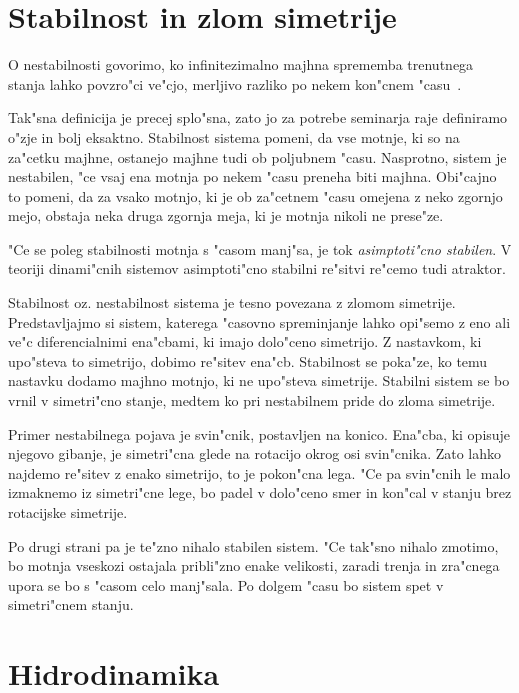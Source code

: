\documentclass[a4paper,12pt]{article}
\begin{document}
\section{Stabilnost in zlom simetrije}

O nestabilnosti govorimo, ko infinitezimalno majhna sprememba trenutnega stanja lahko povzro"ci ve"cjo, merljivo razliko po nekem kon"cnem "casu~\cite{drazin}. 

Tak"sna definicija je precej splo"sna, zato jo za potrebe seminarja raje definiramo o"zje in bolj eksaktno. Stabilnost sistema pomeni, da vse motnje, ki so na za"cetku majhne, ostanejo majhne tudi ob poljubnem "casu. Nasprotno, sistem je nestabilen, "ce vsaj ena motnja po nekem "casu preneha biti majhna. Obi"cajno to pomeni, da za vsako motnjo, ki je ob za"cetnem "casu omejena z neko zgornjo mejo, obstaja neka druga zgornja meja, ki je motnja nikoli ne prese"ze. 

"Ce se poleg stabilnosti motnja s "casom manj"sa, je tok \emph{asimptoti"cno stabilen}. V teoriji dinami"cnih sistemov asimptoti"cno stabilni re"sitvi re"cemo tudi atraktor. 

Stabilnost oz. nestabilnost sistema je tesno povezana z zlomom simetrije. Predstavljajmo si sistem, katerega "casovno spreminjanje lahko opi"semo z eno ali ve"c diferencialnimi ena"cbami, ki imajo dolo"ceno simetrijo. Z nastavkom, ki upo"steva to simetrijo, dobimo re"sitev ena"cb. Stabilnost se poka"ze, ko temu nastavku dodamo majhno motnjo, ki ne upo"steva simetrije. Stabilni sistem se bo vrnil v simetri"cno stanje, medtem ko pri nestabilnem pride do zloma simetrije. 

Primer nestabilnega pojava je svin"cnik, postavljen na konico. Ena"cba, ki opisuje njegovo gibanje, je simetri"cna glede na rotacijo okrog osi svin"cnika. Zato lahko najdemo re"sitev z enako simetrijo, to je pokon"cna lega. "Ce pa svin"cnih le malo izmaknemo iz simetri"cne lege, bo padel v dolo"ceno smer in kon"cal v stanju brez rotacijske simetrije. 

Po drugi strani pa je te"zno nihalo stabilen sistem. "Ce tak"sno nihalo zmotimo, bo motnja vseskozi ostajala pribli"zno enake velikosti, zaradi trenja in zra"cnega upora se bo s "casom celo manj"sala. Po dolgem "casu bo sistem spet v simetri"cnem stanju. 


\section{Hidrodinamika}
\end{document}
